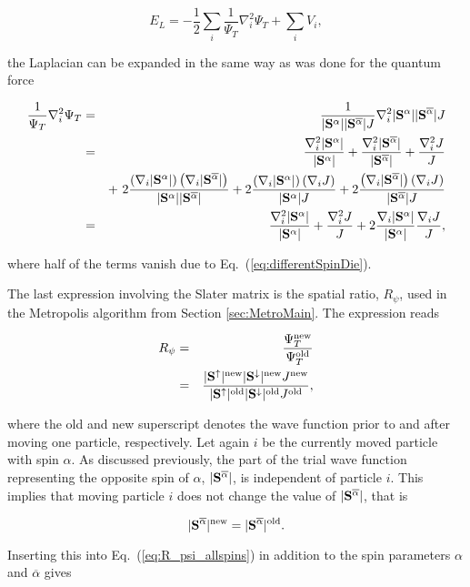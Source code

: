 \begin{equation}
 E_L = -\frac{1}{2}\sum_i \frac{1}{\Psi_T}\nabla^2_i \Psi_T + \sum_iV_i, \label{eq:localEsum}
\end{equation}

the Laplacian can be expanded in the same way as was done for the quantum force

 \begin{eqnarray}
  \frac{1}{\Psi_T}\nabla^2_i\Psi_T &=&  \frac{1}{|\mathbf{S}^{\alpha}||\mathbf{S}^{\overline{\alpha}}| J}\nabla^2_i |\mathbf{S}^{\alpha}||\mathbf{S}^{\overline{\alpha}}| J \nonumber\\
  &=& \frac{\nabla^2_i |\mathbf{S}^{\alpha}|}{|\mathbf{S}^{\alpha}|} + \frac{\nabla^2_i |\mathbf{S}^{\overline{\alpha}}|}{|\mathbf{S}^{\overline{\alpha}}|} + \frac{\nabla^2_i J}{J} \nonumber\\
  && +\,\, 2\frac{\left(\nabla_i|\mathbf{S}^{\alpha}|\right)\left(\nabla_i|\mathbf{S}^{\overline{\alpha}}|\right)}{|\mathbf{S}^{\alpha}||\mathbf{S}^{\overline{\alpha}}|} + 2 \frac{\left(\nabla_i|\mathbf{S}^{\alpha}|\right)\left(\nabla_i J\right)}{|\mathbf{S}^{\alpha}| J} + 2 \frac{\left(\nabla_i|\mathbf{S}^{\overline{\alpha}}|\right)\left(\nabla_i J\right)}{|\mathbf{S}^{\overline{\alpha}}| J} \nonumber\\
  &=& \frac{\nabla^2_i |\mathbf{S}^{\alpha}|}{|\mathbf{S}^{\alpha}|} + \frac{\nabla^2_i J}{J} + 2\frac{\nabla_i|\mathbf{S}^{\alpha}|}{|\mathbf{S}^{\alpha}|} \frac{\nabla_i J}{J},
\end{eqnarray}

where half of the terms vanish due to Eq.~(\ref{eq:differentSpinDie}).

The last expression involving the Slater matrix is the spatial ratio, $R_\psi$, used in the Metropolis algorithm from Section \ref{sec:MetroMain}. The expression reads

\begin{eqnarray}
 R_\psi &=& \frac{\Psi_T^\mathrm{new}}{\Psi_T^\mathrm{old}} \nonumber\\
 &=& \frac{|\mathbf{S}^\uparrow|^\mathrm{new} |\mathbf{S}^\downarrow|^\mathrm{new} J^\mathrm{new}}{|\mathbf{S}^\uparrow|^\mathrm{old} |\mathbf{S}^\downarrow|^\mathrm{old} J^\mathrm{old}}, \label{eq:R_psi_allspins}\\
\end{eqnarray}

where the old and new superscript denotes the wave function prior to and after moving one particle, respectively. Let again $i$ be the currently moved particle with spin $\alpha$. As discussed previously, the part of the trial wave function representing the opposite spin of $\alpha$, $|\mathbf{S}^{\overline{\alpha}}|$, is independent of particle $i$. This implies that moving particle $i$ does not change the value of $|\mathbf{S}^{\overline{\alpha}}|$, that is

\begin{equation}
 |\mathbf{S}^{\overline{\alpha}}|^\mathrm{new} = |\mathbf{S}^{\overline{\alpha}}|^\mathrm{old}.
\end{equation}

Inserting this into Eq.~(\ref{eq:R_psi_allspins}) in addition to the spin parameters $\alpha$ and $\overline{\alpha}$ gives

